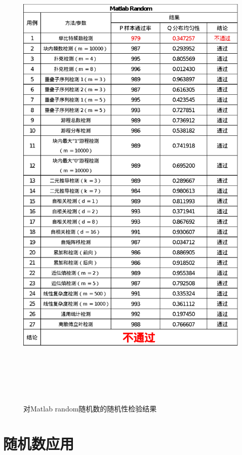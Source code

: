 \documentclass[12pt,a4paper]{article}%
\begin{document}
    \begin{figure}
        \centering
        \includegraphics[height=23.7cm]{Matlab random}
        \caption{对Matlab random随机数的随机性检验结果}
        \label{fig:fig.5}
        \hypertarget{fig:fig.5}{}

    \end{figure}
    \newpage


    \section{随机数应用}
\end{document}
